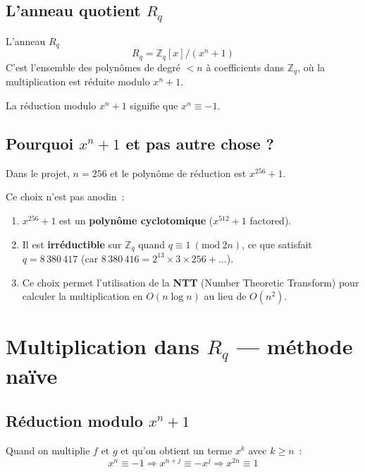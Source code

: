 \documentclass[12pt, a4paper]{article}
\newcommand{\Zq}{\mathbb{Z}_q}
\newcommand{\Rq}{R_q}
\newcommand{\pmod}[1]{\ (\mathrm{mod}\ #1)}
\begin{document}
\subsection{L'anneau quotient $R_q$}

\begin{defbox}{L'anneau $R_q$}
$$\Rq = \Zq[x] / (x^n + 1)$$
C'est l'ensemble des polynômes de degré $< n$ à coefficients dans $\Zq$,
où la multiplication est réduite modulo $x^n + 1$.

La réduction modulo $x^n + 1$ signifie que $x^n \equiv -1$.
\end{defbox}

\subsection{Pourquoi $x^n + 1$ et pas autre chose ?}

\begin{importantbox}
Dans le projet, $n = 256$ et le polynôme de réduction est $x^{256} + 1$.

Ce choix n'est pas anodin~:
\begin{enumerate}
  \item $x^{256} + 1$ est un \textbf{polynôme cyclotomique} ($x^{512} + 1$ factored).
  \item Il est \textbf{irréductible} sur $\Zq$ quand $q \equiv 1 \pmod{2n}$,
        ce que satisfait $q = 8\,380\,417$ (car $8\,380\,416 = 2^{13} \times 3 \times 256 + \ldots$).
  \item Ce choix permet l'utilisation de la \textbf{NTT} (Number Theoretic Transform)
        pour calculer la multiplication en $O(n \log n)$ au lieu de $O(n^2)$.
\end{enumerate}
\end{importantbox}

\section{Multiplication dans $R_q$ --- méthode naïve}

\subsection{Réduction modulo $x^n + 1$}

Quand on multiplie $f$ et $g$ et qu'on obtient un terme $x^k$ avec $k \geq n$~:
$$x^n \equiv -1 \Rightarrow x^{n+j} \equiv -x^j \Rightarrow x^{2n} \equiv 1$$
\end{document}
